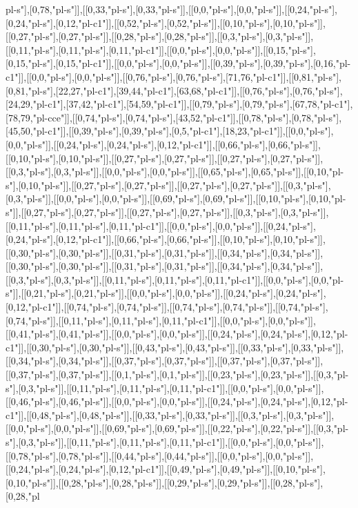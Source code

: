 pl-s"],[0,78,"pl-s"]],[[0,33,"pl-s"],[0,33,"pl-s"]],[[0,0,"pl-s"],[0,0,"pl-s"]],[[0,24,"pl-s"],[0,24,"pl-s"],[0,12,"pl-c1"]],[[0,52,"pl-s"],[0,52,"pl-s"]],[[0,10,"pl-s"],[0,10,"pl-s"]],[[0,27,"pl-s"],[0,27,"pl-s"]],[[0,28,"pl-s"],[0,28,"pl-s"]],[[0,3,"pl-s"],[0,3,"pl-s"]],[[0,11,"pl-s"],[0,11,"pl-s"],[0,11,"pl-c1"]],[[0,0,"pl-s"],[0,0,"pl-s"]],[[0,15,"pl-s"],[0,15,"pl-s"],[0,15,"pl-c1"]],[[0,0,"pl-s"],[0,0,"pl-s"]],[[0,39,"pl-s"],[0,39,"pl-s"],[0,16,"pl-c1"]],[[0,0,"pl-s"],[0,0,"pl-s"]],[[0,76,"pl-s"],[0,76,"pl-s"],[71,76,"pl-c1"]],[[0,81,"pl-s"],[0,81,"pl-s"],[22,27,"pl-c1"],[39,44,"pl-c1"],[63,68,"pl-c1"]],[[0,76,"pl-s"],[0,76,"pl-s"],[24,29,"pl-c1"],[37,42,"pl-c1"],[54,59,"pl-c1"]],[[0,79,"pl-s"],[0,79,"pl-s"],[67,78,"pl-c1"],[78,79,"pl-cce"]],[[0,74,"pl-s"],[0,74,"pl-s"],[43,52,"pl-c1"]],[[0,78,"pl-s"],[0,78,"pl-s"],[45,50,"pl-c1"]],[[0,39,"pl-s"],[0,39,"pl-s"],[0,5,"pl-c1"],[18,23,"pl-c1"]],[[0,0,"pl-s"],[0,0,"pl-s"]],[[0,24,"pl-s"],[0,24,"pl-s"],[0,12,"pl-c1"]],[[0,66,"pl-s"],[0,66,"pl-s"]],[[0,10,"pl-s"],[0,10,"pl-s"]],[[0,27,"pl-s"],[0,27,"pl-s"]],[[0,27,"pl-s"],[0,27,"pl-s"]],[[0,3,"pl-s"],[0,3,"pl-s"]],[[0,0,"pl-s"],[0,0,"pl-s"]],[[0,65,"pl-s"],[0,65,"pl-s"]],[[0,10,"pl-s"],[0,10,"pl-s"]],[[0,27,"pl-s"],[0,27,"pl-s"]],[[0,27,"pl-s"],[0,27,"pl-s"]],[[0,3,"pl-s"],[0,3,"pl-s"]],[[0,0,"pl-s"],[0,0,"pl-s"]],[[0,69,"pl-s"],[0,69,"pl-s"]],[[0,10,"pl-s"],[0,10,"pl-s"]],[[0,27,"pl-s"],[0,27,"pl-s"]],[[0,27,"pl-s"],[0,27,"pl-s"]],[[0,3,"pl-s"],[0,3,"pl-s"]],[[0,11,"pl-s"],[0,11,"pl-s"],[0,11,"pl-c1"]],[[0,0,"pl-s"],[0,0,"pl-s"]],[[0,24,"pl-s"],[0,24,"pl-s"],[0,12,"pl-c1"]],[[0,66,"pl-s"],[0,66,"pl-s"]],[[0,10,"pl-s"],[0,10,"pl-s"]],[[0,30,"pl-s"],[0,30,"pl-s"]],[[0,31,"pl-s"],[0,31,"pl-s"]],[[0,34,"pl-s"],[0,34,"pl-s"]],[[0,30,"pl-s"],[0,30,"pl-s"]],[[0,31,"pl-s"],[0,31,"pl-s"]],[[0,34,"pl-s"],[0,34,"pl-s"]],[[0,3,"pl-s"],[0,3,"pl-s"]],[[0,11,"pl-s"],[0,11,"pl-s"],[0,11,"pl-c1"]],[[0,0,"pl-s"],[0,0,"pl-s"]],[[0,21,"pl-s"],[0,21,"pl-s"]],[[0,0,"pl-s"],[0,0,"pl-s"]],[[0,24,"pl-s"],[0,24,"pl-s"],[0,12,"pl-c1"]],[[0,74,"pl-s"],[0,74,"pl-s"]],[[0,74,"pl-s"],[0,74,"pl-s"]],[[0,74,"pl-s"],[0,74,"pl-s"]],[[0,11,"pl-s"],[0,11,"pl-s"],[0,11,"pl-c1"]],[[0,0,"pl-s"],[0,0,"pl-s"]],[[0,41,"pl-s"],[0,41,"pl-s"]],[[0,0,"pl-s"],[0,0,"pl-s"]],[[0,24,"pl-s"],[0,24,"pl-s"],[0,12,"pl-c1"]],[[0,30,"pl-s"],[0,30,"pl-s"]],[[0,43,"pl-s"],[0,43,"pl-s"]],[[0,33,"pl-s"],[0,33,"pl-s"]],[[0,34,"pl-s"],[0,34,"pl-s"]],[[0,37,"pl-s"],[0,37,"pl-s"]],[[0,37,"pl-s"],[0,37,"pl-s"]],[[0,37,"pl-s"],[0,37,"pl-s"]],[[0,1,"pl-s"],[0,1,"pl-s"]],[[0,23,"pl-s"],[0,23,"pl-s"]],[[0,3,"pl-s"],[0,3,"pl-s"]],[[0,11,"pl-s"],[0,11,"pl-s"],[0,11,"pl-c1"]],[[0,0,"pl-s"],[0,0,"pl-s"]],[[0,46,"pl-s"],[0,46,"pl-s"]],[[0,0,"pl-s"],[0,0,"pl-s"]],[[0,24,"pl-s"],[0,24,"pl-s"],[0,12,"pl-c1"]],[[0,48,"pl-s"],[0,48,"pl-s"]],[[0,33,"pl-s"],[0,33,"pl-s"]],[[0,3,"pl-s"],[0,3,"pl-s"]],[[0,0,"pl-s"],[0,0,"pl-s"]],[[0,69,"pl-s"],[0,69,"pl-s"]],[[0,22,"pl-s"],[0,22,"pl-s"]],[[0,3,"pl-s"],[0,3,"pl-s"]],[[0,11,"pl-s"],[0,11,"pl-s"],[0,11,"pl-c1"]],[[0,0,"pl-s"],[0,0,"pl-s"]],[[0,78,"pl-s"],[0,78,"pl-s"]],[[0,44,"pl-s"],[0,44,"pl-s"]],[[0,0,"pl-s"],[0,0,"pl-s"]],[[0,24,"pl-s"],[0,24,"pl-s"],[0,12,"pl-c1"]],[[0,49,"pl-s"],[0,49,"pl-s"]],[[0,10,"pl-s"],[0,10,"pl-s"]],[[0,28,"pl-s"],[0,28,"pl-s"]],[[0,29,"pl-s"],[0,29,"pl-s"]],[[0,28,"pl-s"],[0,28,"pl